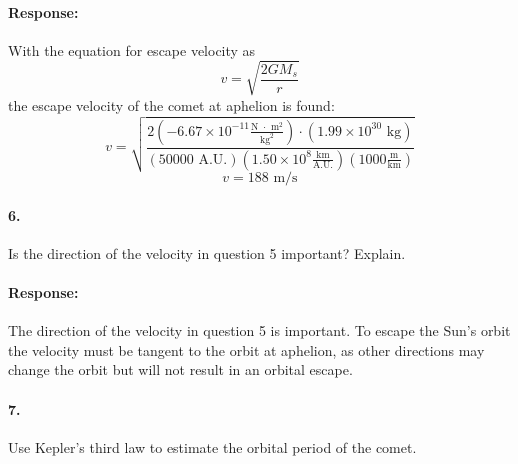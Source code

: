 \documentclass[12pt]{article}
\begin{document}
	\paragraph{Response:}
		With the equation for escape velocity as
		\begin{equation}
			v = \sqrt{\frac{2GM_s}{r}}
		\end{equation}
		the escape velocity of the comet at aphelion is found:
		$$ v = \sqrt{\frac{2\left(-6.67 \times 10^{-11}\frac{\text{N } \cdot \text{ m}^2}{\text{kg}^2}\right) \cdot \left(1.99 \times 10^{30} \text{ kg}\right)}{(50000 \text{ A.U.})\left(1.50 \times 10^8 \frac{\text{km}}{\text{A.U.}}\right)\left(1000 \frac{\text{m}}{\text{km}}\right)}} $$
		$$ v = 188\text{ m/s} $$

	\paragraph{6.}
	Is the direction of the velocity in question 5 important? Explain.
	
	\paragraph{Response:}
		The direction of the velocity in question 5 is important. To escape the Sun's orbit the velocity must be tangent to the orbit at aphelion, as other directions may change the orbit but will not result in an orbital escape.
	
	\paragraph{7.}
	Use Kepler's third law to estimate the orbital period of the comet.
\end{document}

